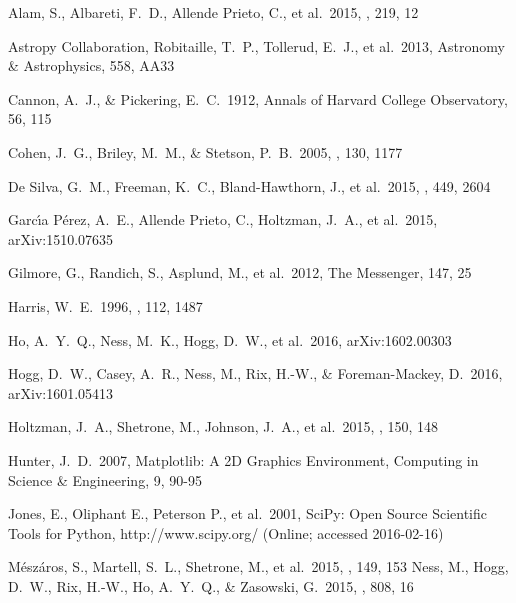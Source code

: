 \documentclass[12pt,preprint]{aastex6}
\begin{document}
\begin{thebibliography}{dummy}\raggedright

 Alam, S., Albareti, F.~D., 
Allende Prieto, C., et al.\ 2015, \apjs, 219, 12 

 Astropy Collaboration, Robitaille, T.~P., Tollerud, E.~J., et al.\ 2013, Astronomy \& Astrophysics, 558, AA33 

 Cannon, A.~J., \& Pickering, E.~C.\ 1912, Annals of Harvard College Observatory, 56, 115 

 Cohen, J.~G., Briley, 
M.~M., \& Stetson, P.~B.\ 2005, \aj, 130, 1177 

 De Silva, G.~M., 
Freeman, K.~C., Bland-Hawthorn, J., et al.\ 2015, \mnras, 449, 2604 

Garc{\'{\i}}a P{\'e}rez, A.~E., Allende Prieto, C., Holtzman, J.~A., et 
al.\ 2015, arXiv:1510.07635 

 Gilmore, G., Randich, 
S., Asplund, M., et al.\ 2012, The Messenger, 147, 25 

 Harris, W.~E.\ 1996, \aj, 112, 
1487 

 Ho, A.~Y.~Q., Ness, M.~K., 
Hogg, D.~W., et al.\ 2016, arXiv:1602.00303 

 Hogg, D.~W., Casey, A.~R., 
Ness, M., Rix, H.-W., \& Foreman-Mackey, D.\ 2016, arXiv:1601.05413 

 Holtzman, J.~A., 
Shetrone, M., Johnson, J.~A., et al.\ 2015, \aj, 150, 148 

 Hunter, J.~D.\ 2007, Matplotlib: A 2D Graphics Environment, Computing in Science \& Engineering, 9, 90-95

 Jones, E., Oliphant E., Peterson P., et al.\ 2001, SciPy: Open Source Scientific Tools for Python, http://www.scipy.org/ (Online; accessed 2016-02-16)

M{\'e}sz{\'a}ros, S., Martell, S.~L., Shetrone, M., et al.\ 2015, \aj, 149, 
153 
 Ness, M., Hogg, D.~W., 
Rix, H.-W., Ho, A.~Y.~Q., \& Zasowski, G.\ 2015, \apj, 808, 16


\end{thebibliography}
\end{document}
